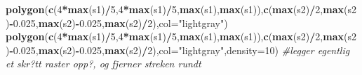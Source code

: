 \documentclass[]{article}
\newenvironment{Shaded}{\begin{snugshade}}{\end{snugshade}}
\newcommand{\CommentTok}[1]{\textcolor[rgb]{0.56,0.35,0.01}{\textit{#1}}}
\newcommand{\DataTypeTok}[1]{\textcolor[rgb]{0.13,0.29,0.53}{#1}}
\newcommand{\DecValTok}[1]{\textcolor[rgb]{0.00,0.00,0.81}{#1}}
\newcommand{\FloatTok}[1]{\textcolor[rgb]{0.00,0.00,0.81}{#1}}
\newcommand{\KeywordTok}[1]{\textcolor[rgb]{0.13,0.29,0.53}{\textbf{#1}}}
\newcommand{\NormalTok}[1]{#1}
\newcommand{\OperatorTok}[1]{\textcolor[rgb]{0.81,0.36,0.00}{\textbf{#1}}}
\newcommand{\StringTok}[1]{\textcolor[rgb]{0.31,0.60,0.02}{#1}}
\begin{document}
\begin{Shaded}
\begin{Highlighting}[]
\KeywordTok{polygon}\NormalTok{(}\KeywordTok{c}\NormalTok{(}\DecValTok{4}\OperatorTok{*}\KeywordTok{max}\NormalTok{(s1)}\OperatorTok{/}\DecValTok{5}\NormalTok{,}\DecValTok{4}\OperatorTok{*}\KeywordTok{max}\NormalTok{(s1)}\OperatorTok{/}\DecValTok{5}\NormalTok{,}\KeywordTok{max}\NormalTok{(s1),}\KeywordTok{max}\NormalTok{(s1)),}\KeywordTok{c}\NormalTok{(}\KeywordTok{max}\NormalTok{(s2)}\OperatorTok{/}\DecValTok{2}\NormalTok{,}\KeywordTok{max}\NormalTok{(s2)}\OperatorTok{-}\FloatTok{0.025}\NormalTok{,}\KeywordTok{max}\NormalTok{(s2)}\OperatorTok{-}\FloatTok{0.025}\NormalTok{,}\KeywordTok{max}\NormalTok{(s2)}\OperatorTok{/}\DecValTok{2}\NormalTok{),}\DataTypeTok{col=}\StringTok{"lightgray"}\NormalTok{)}
\KeywordTok{polygon}\NormalTok{(}\KeywordTok{c}\NormalTok{(}\DecValTok{4}\OperatorTok{*}\KeywordTok{max}\NormalTok{(s1)}\OperatorTok{/}\DecValTok{5}\NormalTok{,}\DecValTok{4}\OperatorTok{*}\KeywordTok{max}\NormalTok{(s1)}\OperatorTok{/}\DecValTok{5}\NormalTok{,}\KeywordTok{max}\NormalTok{(s1),}\KeywordTok{max}\NormalTok{(s1)),}\KeywordTok{c}\NormalTok{(}\KeywordTok{max}\NormalTok{(s2)}\OperatorTok{/}\DecValTok{2}\NormalTok{,}\KeywordTok{max}\NormalTok{(s2)}\OperatorTok{-}\FloatTok{0.025}\NormalTok{,}\KeywordTok{max}\NormalTok{(s2)}\OperatorTok{-}\FloatTok{0.025}\NormalTok{,}\KeywordTok{max}\NormalTok{(s2)}\OperatorTok{/}\DecValTok{2}\NormalTok{),}\DataTypeTok{col=}\StringTok{"lightgray"}\NormalTok{,}\DataTypeTok{density=}\DecValTok{10}\NormalTok{) }\CommentTok{#legger egentlig et skr?tt raster opp?, og fjerner streken rundt}


\end{Highlighting}
\end{Shaded}
\end{document}
